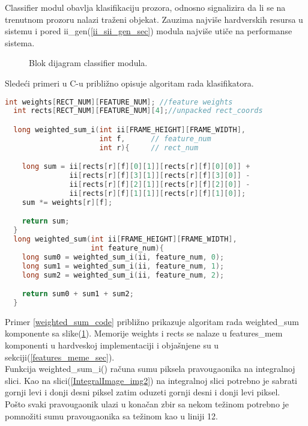 Classifier modul obavlja klasifikaciju prozora, odnosno signalizira da li se na
trenutnom prozoru nalazi traženi objekat.
Zauzima najviše hardverskih resursa u sistemu i pored ii\_gen(\ref{ii_sii_gen_sec})
modula najviše utiče na performanse sistema.

\begin{figure}[H]
  \centering
  \scalebox{0.80}{
    
    }
\caption{Blok dijagram classifier modula.}
\label{classifier_bd}
\end{figure}

\newpage

Sledeći primeri u C-u približno opisuje algoritam rada klasifikatora.

\begin{lstlisting}[language=C++,caption={Weighted\_sum u \textbf{C}-u},captionpos=b, label=weighted_sum_code]
  int weights[RECT_NUM][FEATURE_NUM]; //feature weights
  int rects[RECT_NUM][FEATURE_NUM][4];//unpacked rect_coords

  long weighted_sum_i(int ii[FRAME_HEIGHT][FRAME_WIDTH],
                      int f,      // feature_num
                      int r){     // rect_num

    long sum = ii[rects[r][f][0][1]][rects[r][f][0][0]] +
               ii[rects[r][f][3][1]][rects[r][f][3][0]] -
               ii[rects[r][f][2][1]][rects[r][f][2][0]] -
               ii[rects[r][f][1][1]][rects[r][f][1][0]];
    sum *= weights[r][f];

    return sum;
  }
  long weighted_sum(int ii[FRAME_HEIGHT][FRAME_WIDTH],
                    int feature_num){
    long sum0 = weighted_sum_i(ii, feature_num, 0);
    long sum1 = weighted_sum_i(ii, feature_num, 1);
    long sum2 = weighted_sum_i(ii, feature_num, 2);

    return sum0 + sum1 + sum2;
  }
\end{lstlisting}

Primer \ref{weighted_sum_code} približno prikazuje algoritam rada weighted\_sum
komponente sa slike(\ref{classifier_bd}).
Memorije weights i rects se nalaze u features\_mem komponenti u hardveskoj
implementaciji i objašnjene su u sekciji(\ref{features_meme_sec}).\\

Funkcija weighted\_sum\_i() računa sumu piksela pravougaonika na integralnoj slici.
Kao na slici(\ref{IntegralImage_img2}) na integralnoj slici potrebno je sabrati
gornji levi i donji desni piksel zatim oduzeti gornji desni i donji levi
piksel.\\
Pošto svaki pravougaonik ulazi u konačan zbir sa nekom težinom potrebno je
pomnožiti sumu pravougaonika sa težinom kao u liniji 12. \\

